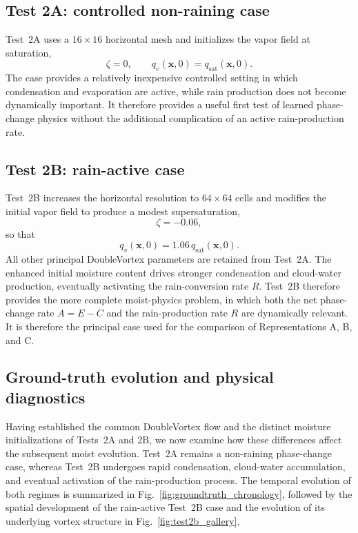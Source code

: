 \documentclass[12pt]{article}
\begin{document}
\subsection{Test 2A: controlled non-raining case}

Test~2A uses a $16\times16$ horizontal mesh and initializes the vapor field at
saturation,
\begin{equation}
	\zeta=0,
	\qquad
	q_v(\mathbf{x},0)=q_{\mathrm{sat}}(\mathbf{x},0).
\end{equation}
The case provides a relatively inexpensive controlled setting in which
condensation and evaporation are active, while rain production does not become
dynamically important. It therefore provides a useful first test of learned
phase-change physics without the additional complication of an active
rain-production rate.


\subsection{Test 2B: rain-active case}

Test~2B increases the horizontal resolution to $64\times64$ cells and modifies
the initial vapor field to produce a modest supersaturation,
\begin{equation}
	\zeta=-0.06,
\end{equation}
so that
\begin{equation}
	q_v(\mathbf{x},0)
	=
	1.06\,q_{\mathrm{sat}}(\mathbf{x},0).
\end{equation}
All other principal DoubleVortex parameters are retained from Test~2A.
The enhanced initial moisture content drives stronger condensation and
cloud-water production, eventually activating the rain-conversion rate $R$.
Test~2B therefore provides the more complete moist-physics problem, in which
both the net phase-change rate $A=E-C$ and the rain-production rate $R$ are
dynamically relevant. It is therefore the principal case used for the
comparison of Representations A, B, and C.

\subsection{Ground-truth evolution and physical diagnostics}

Having established the common DoubleVortex flow and the distinct moisture
initializations of Tests~2A and 2B, we now examine how these differences affect
the subsequent moist evolution. Test~2A remains a non-raining phase-change
case, whereas Test~2B undergoes rapid condensation, cloud-water accumulation,
and eventual activation of the rain-production process. The temporal evolution
of both regimes is summarized in Fig.~\ref{fig:groundtruth_chronology}, followed
by the spatial development of the rain-active Test~2B case and the evolution of
its underlying vortex structure in Fig.~\ref{fig:test2b_gallery}.
\end{document}
